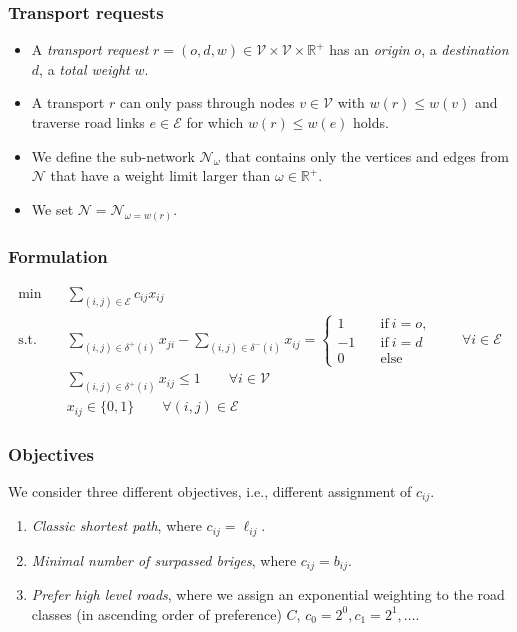 \documentclass{beamer}   %
\theoremstyle{break}
\begin{document}
  \begin{frame}
    \frametitle{Transport requests}

    \begin{itemize}
      \item
      A \emph{transport request} $r=(o,d,w) \in \mathcal{V} \times \mathcal{V} \times \mathbb{R}^{+}$
      has an \emph{origin} $o$, a \emph{destination} $d$, a \emph{total weight} $w$.

      \item A transport $r$ can only pass through nodes $v \in \mathcal{V}$ with
      $w(r) \leq w(v)$ and traverse road links $e \in \mathcal{E}$ for which $w(r) \leq w(e)$ holds.

      \item We define the sub-network $\mathcal{N}_{\omega}$ that contains only the vertices and edges from $\mathcal{N}$ that have a weight limit larger than $\omega \in \mathbb{R}^{+}$.

      \item We set $\mathcal{N}=\mathcal{N}_{\omega=w(r)}$.
    \end{itemize}

  \end{frame}



  \begin{frame}
    \frametitle{Formulation}
    \begin{align}
      \min \quad &\sum_{(i,j)\in \mathcal{E}}  c_{ij} x_{ij} \label{obj} \\
      \text{s.t.}\quad &
      \sum_{(i,j)\in \delta^{+} (i)} x_{ji} - \sum_{(i,j)\in \delta^{-}(i)} x_{ij} =
      \begin{cases}
        1 \quad& \text{if}~ i=o, \\
        -1 \quad& \text{if}~ i=d \\
        0 \quad&\text{else}
      \end{cases}
      \qquad \forall i \in \mathcal{E}
      \\
      &  \sum_{(i,j)\in \delta^{+} (i)} x_ {ij} \leq 1     \qquad \forall i \in \mathcal{V}\\
      &  x_{ij} \in \{0,1\}   \qquad \forall (i,j) \in \mathcal{E}
    \end{align}
  \end{frame}


  \begin{frame}
    \frametitle{Objectives}
    We consider three different objectives, i.e., different assignment of $c_{ij}$.
    \begin{enumerate}
      \item \emph{Classic shortest path}, where $c_{ij}=\ell_{ij}$. \label{obj_short}
      \item \emph{Minimal number of surpassed briges}, where  $c_{ij}=b_{ij}$.  \label{obj_minBridge}
      \item \emph{Prefer high level roads}, where we assign an exponential weighting to the road classes (in ascending order of preference) $C$, $c_0=2^0,c_1=2^1, \ldots$.  \label{obj_highLevelRoad}
    \end{enumerate}
  \end{frame}
\end{document}
